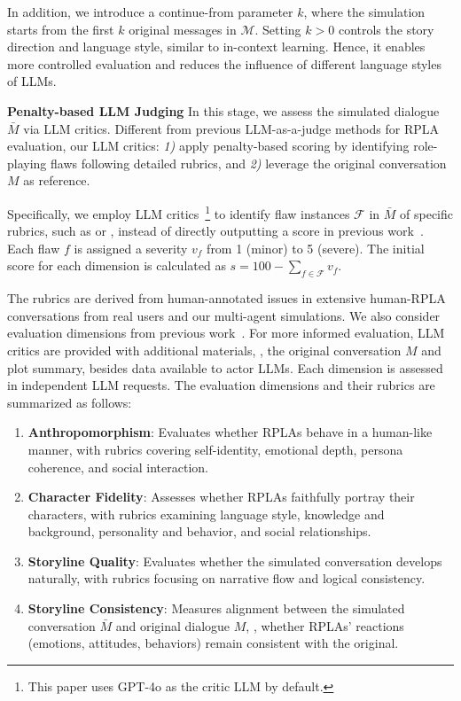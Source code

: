 In addition, we introduce a continue-from parameter $k$, where the simulation starts from the first $k$ original messages in $\mathcal{M}$. 
Setting $k>0$ controls the story direction and language style, similar to in-context learning. 
Hence, it enables more controlled evaluation and reduces the influence of different language styles of LLMs. 

\textbf{Penalty-based LLM Judging} \quad 
In this stage, we assess the simulated dialogue $\bar{M}$ via LLM critics. 
Different from previous LLM-as-a-judge methods for RPLA evaluation, our LLM critics:  
\textit{1)} apply penalty-based scoring by identifying role-playing flaws following detailed rubrics, and 
\textit{2)} leverage the original conversation $M$ as reference. 

Specifically, we employ LLM critics~\footnote{This paper uses GPT-4o as the critic LLM by default. } to identify  flaw instances $\mathcal{F}$ in $\bar{M}$ of specific rubrics, such as   or , instead of directly outputting a score in previous work~\citep{wang2023rolellm, tu2024charactereval}. 
Each flaw $f$ is assigned a severity $v_f$ from 1 (minor) to 5 (severe). 
The initial score for each dimension is calculated as $s = 100-\sum_{f\in\mathcal{F}}v_f$. 

The rubrics are derived from human-annotated issues in extensive human-RPLA conversations from real users and our multi-agent simulations. 
We also consider evaluation dimensions from previous work~\citep{shanahan2023role, shao2023character, chen2024from}. 
For more informed evaluation, LLM critics are provided with additional materials, \ie, the original conversation $M$ and plot summary, besides data available to actor LLMs. 
Each dimension is assessed in independent LLM requests. 
The evaluation dimensions and their rubrics are summarized as follows:
\begin{enumerate}[itemsep=-3pt, topsep=0pt, partopsep=0pt]
    \item \textbf{Anthropomorphism}: Evaluates whether RPLAs behave in a human-like manner, with rubrics covering self-identity, emotional depth, persona coherence, and social interaction. 
    \item \textbf{Character Fidelity}: Assesses whether RPLAs faithfully portray their characters, with rubrics examining language style, knowledge and background, personality and behavior, and social relationships. 
    \item \textbf{Storyline Quality}: Evaluates whether the simulated conversation develops naturally, with rubrics focusing on narrative flow and logical consistency. 
    \item \textbf{Storyline Consistency}:  Measures alignment between the simulated conversation $\bar{M}$ and original dialogue $M$, \ie, whether RPLAs' reactions (emotions, attitudes, behaviors) remain consistent with the original. 
\end{enumerate} 

